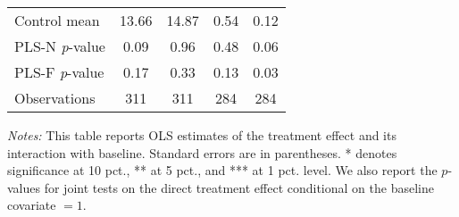 \begin{table}[ht]
{\begin{threeparttable}
\begin{tabular}{l*{4}{c}}
Control mean    &    13.66         &    14.87         &     0.54         &     0.12         \\
PLS-N \emph{p}-value&     0.09         &     0.96         &     0.48         &     0.06         \\
PLS-F \emph{p}-value&     0.17         &     0.33         &     0.13         &     0.03         \\
Observations    &      311         &      311         &      284         &      284         \\
\bottomrule \end{tabular} \begin{tablenotes}[flushleft] \footnotesize \item \emph{Notes:} This table reports OLS estimates of the treatment effect and its interaction with baseline. Standard errors are in parentheses. * denotes significance at 10 pct., ** at 5 pct., and *** at 1 pct. level. We also report the \(p\)-values for joint tests on the direct treatment effect conditional on the baseline covariate $= 1$. \end{tablenotes} \end{threeparttable} } \end{table}

